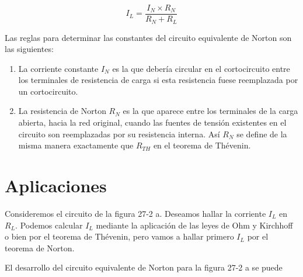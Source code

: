 \[
I_L = \frac{I_N \times R_N}{R_N + R_L}
\tag{27-1}
\]

Las reglas para determinar las constantes del circuito equivalente de Norton son las siguientes:

\begin{enumerate}
    \item La corriente constante \( I_N \) es la que debería circular en el cortocircuito entre los terminales de resistencia de carga si esta resistencia fuese reemplazada por un cortocircuito.
    \item La resistencia de Norton \( R_N \) es la que aparece entre los terminales de la carga abierta, hacia la red original, cuando las fuentes de tensión existentes en el circuito son reemplazadas por su resistencia interna. Así \( R_N \) se define de la misma manera exactamente que \( R_{TH} \) en el teorema de Thévenin.
\end{enumerate}

\section{Aplicaciones}
Consideremos el circuito de la figura 27-2 a. Deseamos hallar la corriente \( I_L \) en \( R_L \). Podemos calcular \( I_L \) mediante la aplicación de las leyes de Ohm y Kirchhoff o bien por el teorema de Thévenin, pero vamos a hallar primero \( I_L \) por el teorema de Norton.

El desarrollo del circuito equivalente de Norton para la figura 27-2 a se puede